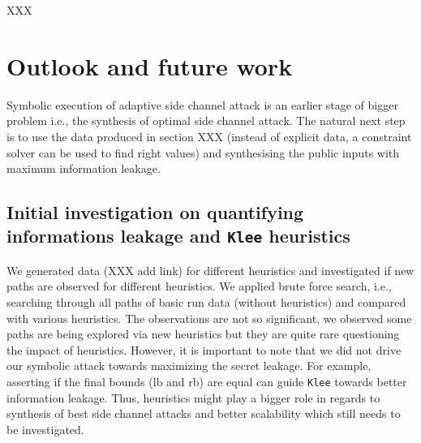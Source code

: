 \documentclass[11pt,a4paper,notitlepage]{article}
\begin{document}
XXX


\section{Outlook and future work}
\label{sec:futurework}

Symbolic execution of adaptive side channel attack is an earlier stage of bigger problem i.e., the synthesis of optimal side channel attack.
The natural next step is to use the data produced in section XXX (instead of explicit data, a constraint solver can be used to find right values) and synthesising the public inputs with maximum information leakage.

\subsection{Initial investigation on quantifying informations leakage and \texttt{Klee} heuristics}
\label{subsec:initialinvestigationleakage}

We generated data (XXX add link) for different heuristics and investigated if new paths are observed for different heuristics.
We applied brute force search, i.e., searching through all paths of basic run data (without heuristics) and compared with various heuristics.
The observations are not so significant, we observed some paths are being explored via new heuristics but they are quite rare questioning the impact of heuristics.
However, it is important to note that we did not drive our symbolic attack towards maximizing the secret leakage.
For example, asserting if the final bounds (lb and rb) are equal can guide \texttt{Klee} towards better information leakage.
Thus, heuristics might play a bigger role in regards to synthesis of best side channel attacks and better scalability which still needs to be investigated.





\end{document}
